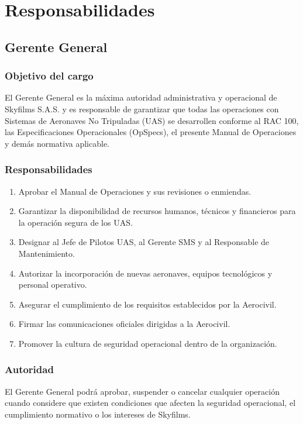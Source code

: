 \section{Responsabilidades}


\subsection{Gerente General}

\subsubsection*{Objetivo del cargo}

El Gerente General es la máxima autoridad administrativa y operacional de Skyfilms S.A.S. y es responsable de garantizar que todas las operaciones con Sistemas de Aeronaves No Tripuladas (UAS) se desarrollen conforme al RAC 100, las Especificaciones Operacionales (OpSpecs), el presente Manual de Operaciones y demás normativa aplicable.

\subsubsection*{Responsabilidades}

\begin{enumerate}[label=\alph*)]
\item Aprobar el Manual de Operaciones y sus revisiones o enmiendas.
\item Garantizar la disponibilidad de recursos humanos, técnicos y financieros para la operación segura de los UAS.
\item Designar al Jefe de Pilotos UAS, al Gerente SMS y al Responsable de Mantenimiento.
\item Autorizar la incorporación de nuevas aeronaves, equipos tecnológicos y personal operativo.
\item Asegurar el cumplimiento de los requisitos establecidos por la Aerocivil.
\item Firmar las comunicaciones oficiales dirigidas a la Aerocivil.
\item Promover la cultura de seguridad operacional dentro de la organización.
\end{enumerate}

\subsubsection*{Autoridad}

El Gerente General podrá aprobar, suspender o cancelar cualquier operación cuando considere que existen condiciones que afecten la seguridad operacional, el cumplimiento normativo o los intereses de Skyfilms.

